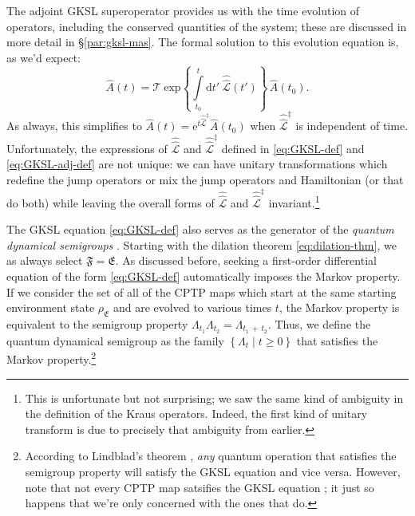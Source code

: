 \documentclass[preprints,article,accept,moreauthors,pdftex]{Definitions/mdpi}
\begin{document}
\begin{paracol}{2}
\switchcolumn
\noindent %
The adjoint GKSL superoperator provides us with the time evolution of operators, including the conserved quantities of the system; these are discussed in more detail in \S\ref{par:gksl-mas}. %
The formal solution to this evolution equation is, as we'd expect:
\begin{equation}
    \label{eq:adj-LvN-formal-sol}
    \widehat{A}\left(t\right) = \mathcal{T}\:\mathrm{exp}\left\{\int\limits_{t_{0}}^{t}\mathrm{d}t'\:\hat{\hat{\mathcal{L}}}\left(t'\right)\right\}\,\widehat{A}\left(t_{0}\right).
\end{equation}
As always, this simplifies to $\widehat{A}\left(t\right) = \mathrm{e}^{t\hat{\hat{\mathcal{L}}}^{\ddagger}}\widehat{A}\left(t_{0}\right)$ when $\hat{\hat{\mathcal{L}}}^{\ddagger}$ is independent of time. Unfortunately, the expressions of $\hat{\hat{\mathcal{L}}}$ and $\hat{\hat{\mathcal{L}}}^{\ddagger}$ defined in \eqref{eq:GKSL-def} and \eqref{eq:GKSL-adj-def} are not unique: we can have unitary transformations which redefine the jump operators or mix the jump operators and Hamiltonian (or that do both) while leaving the overall forms of $\hat{\hat{\mathcal{L}}}$ and $\hat{\hat{\mathcal{L}}}^{\ddagger}$ invariant.\footnote{This is unfortunate but not surprising; we saw the same kind of ambiguity in the definition of the Kraus operators. Indeed, the first kind of unitary transform is due to precisely that ambiguity from earlier.}

The GKSL equation \eqref{eq:GKSL-def} also serves as the generator of the \emph{quantum dynamical semigroups} \cite{Alicki07,Kossakowski72,Ingarden75}. Starting with the dilation theorem \eqref{eq:dilation-thm}, we as always select $\mathfrak{F} = \mathfrak{E}$. As discussed before, seeking a first-order differential equation of the form \eqref{eq:GKSL-def} automatically imposes the Markov property. If we consider the set of all of the CPTP maps which start at the same starting environment state $\rho_{\mathfrak{E}}$ and are evolved to various times $t$, the Markov property is equivalent to the semigroup property $\Lambda_{t_{1}}\Lambda_{t_{2}} = \Lambda_{t_{1}\,+\,t_{2}}$. Thus, we define the quantum dynamical semigroup as the family $\left\{\Lambda_{t}\mid t\geq0\right\}$ that satisfies the Markov property.\footnote{According to Lindblad's theorem \cite{Lindblad76}, \emph{any} quantum operation that satisfies the semigroup property will satisfy the GKSL equation and vice versa. However, note that not every CPTP map satsifies the GKSL equation \cite{Wolf08, WECC08}; it just so happens that we're only concerned with the ones that do.

}
\end{paracol}
\end{document}
